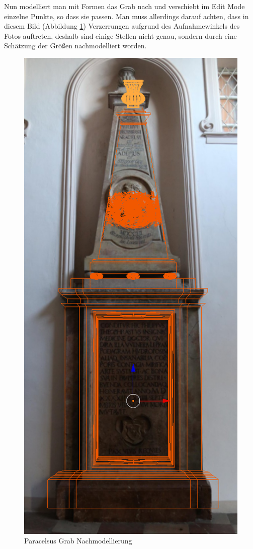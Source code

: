 Nun modelliert man mit Formen das Grab nach und verschiebt im Edit Mode einzelne Punkte, so dass sie passen. Man muss allerdings darauf achten, dass in diesem Bild
(Abbildung \ref{Paracelsus_Grab:image2}) Verzerrungen aufgrund des Aufnahmewinkels des Fotos auftreten, deshalb sind einige Stellen nicht genau, sondern
durch eine Schätzung der Größen nachmodelliert worden.

\begin{figure}[H]
    \centering
    \includegraphics[width=.8\textwidth]{images/Paracelsus-Grab_Nachmodellierung.png}
    \caption{Paracelsus Grab Nachmodellierung}
    \label{Paracelsus_Grab:image2}
\end{figure}

